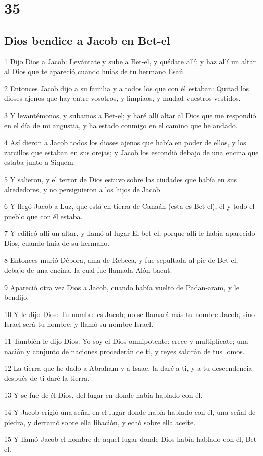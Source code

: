 \chapter{35}

\section*{Dios bendice a Jacob en Bet-el}

\par 1 Dijo Dios a Jacob: Levántate y sube a Bet-el, y quédate allí; y haz allí un altar al Dios que te apareció cuando huías de tu hermano Esaú.
\par 2 Entonces Jacob dijo a su familia y a todos los que con él estaban: Quitad los dioses ajenos que hay entre vosotros, y limpiaos, y mudad vuestros vestidos.
\par 3 Y levantémonos, y subamos a Bet-el; y haré allí altar al Dios que me respondió en el día de mi angustia, y ha estado conmigo en el camino que he andado.
\par 4 Así dieron a Jacob todos los dioses ajenos que había en poder de ellos, y los zarcillos que estaban en sus orejas; y Jacob los escondió debajo de una encina que estaba junto a Siquem.
\par 5 Y salieron, y el terror de Dios estuvo sobre las ciudades que había en sus alrededores, y no persiguieron a los hijos de Jacob.
\par 6 Y llegó Jacob a Luz, que está en tierra de Canaán (esta es Bet-el), él y todo el pueblo que con él estaba.
\par 7 Y edificó allí un altar, y llamó al lugar El-bet-el, porque allí le había aparecido Dios, cuando huía de su hermano.
\par 8 Entonces murió Débora, ama de Rebeca, y fue sepultada al pie de Bet-el, debajo de una encina, la cual fue llamada Alón-bacut.
\par 9 Apareció otra vez Dios a Jacob, cuando había vuelto de Padan-aram, y le bendijo.
\par 10 Y le dijo Dios: Tu nombre es Jacob; no se llamará más tu nombre Jacob, sino Israel será tu nombre; y llamó su nombre Israel.
\par 11 También le dijo Dios: Yo soy el Dios omnipotente: crece y multiplícate; una nación y conjunto de naciones procederán de ti, y reyes saldrán de tus lomos.
\par 12 La tierra que he dado a Abraham y a Isaac, la daré a ti, y a tu descendencia después de ti daré la tierra.
\par 13 Y se fue de él Dios, del lugar en donde había hablado con él.
\par 14 Y Jacob erigió una señal en el lugar donde había hablado con él, una señal de piedra, y derramó sobre ella libación, y echó sobre ella aceite.
\par 15 Y llamó Jacob el nombre de aquel lugar donde Dios había hablado con él, Bet-el.

